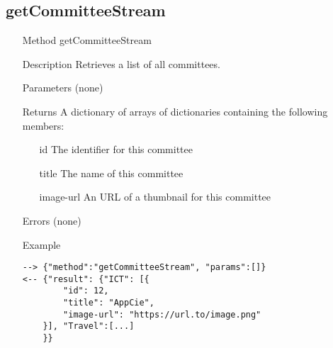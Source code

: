 \documentclass[a4paper]{scrreprt}
\begin{document}
\subsection{getCommitteeStream}
\begin{enumerate}
\item[Method] getCommitteeStream
\item[Description] Retrieves a list of all committees.
\item[Parameters] (none)
\item[Returns] A dictionary of arrays of dictionaries containing the following members:
\begin{enumerate}
    \item[id] The identifier for this committee
    \item[title] The name of this committee
    \item[image-url] An URL of a thumbnail for this committee
	\end{enumerate}
\item[Errors] (none)
\item[Example]
\begin{lstlisting}
--> {"method":"getCommitteeStream", "params":[]}
<-- {"result": {"ICT": [{
        "id": 12,
        "title": "AppCie", 
        "image-url": "https://url.to/image.png"
    }], "Travel":[...]
    }}
\end{lstlisting}
\end{enumerate}
\end{document}
